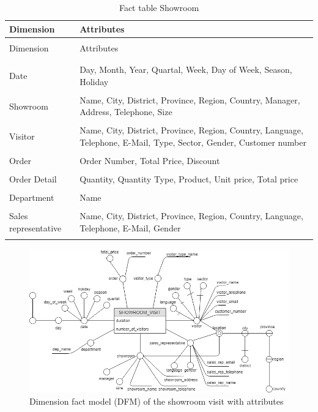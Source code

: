 \documentclass[letterpaper,12pt]{article}
\begin{document}
\begingroup
\renewcommand\arraystretch{0.5}
\begin{longtable}{p{3.7cm}p{10cm}}
        \caption{Fact table Showroom} \\
        Dimension & Attributes \\
        \endfirsthead \\
        Dimension & Attributes \\
        \endhead \\
        \hline \\
        Date & Day, Month, Year, Quartal, Week, Day of Week, Season, Holiday \\
        \hline \\
        Showroom & Name, City, District, Province, Region, Country, Manager, Address, Telephone, Size \\
        \hline \\
        Visitor & Name, City, District, Province, Region, Country, Language, Telephone, E-Mail, Type, Sector, Gender, Customer number \\
        \hline \\
        Order & Order Number, Total Price, Discount \\
        \hline \\
        Order Detail & Quantity, Quantity Type, Product, Unit price, Total price \\
        \hline \\
        Department & Name \\
        \hline \\
        Sales representative & Name, City, District, Province, Region, Country, Language, Telephone, E-Mail, Gender \\
        \hline \\
\end{longtable}
\endgroup

\begin{figure}[H] 
        \centering
        \includegraphics[width=\columnwidth]{../images/DFM_Showroom.png}
        \caption{
                \label{fig:showroomAttributes}  
                Dimension fact model (DFM) of the showroom visit with attributes 
        }
\end{figure}
\end{document}
